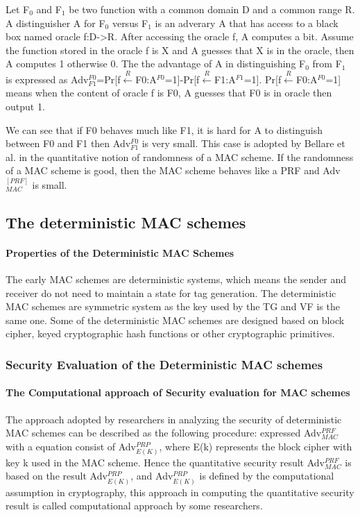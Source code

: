 \documentclass{article}
\begin{document}
Let F$_0$ and F$_1$ be two function with a common domain D and a common range R. A distinguisher A for F$_0$ versus F$_1$ is an adverary A that has access to a black box named oracle f:D->R. After accessing the oracle f, A computes a bit. Assume the function stored in the oracle f is X and A guesses that X is in the oracle, then A computes 1 otherwise 0. The the advantage of A in distinguishing F$_0$ from F$_1$ is expressed as Adv$^{F0}_{F1}$=Pr[f$\stackrel{R}{\longleftarrow}$F0:A$^{F0}$=1]-Pr[f$\stackrel{R}{\longleftarrow}$F1:A$^{F1}$=1]. Pr[f$\stackrel{R}{\longleftarrow}$F0:A$^{F0}$=1] means when the content of oracle f is F0, A guesses that F0 is in oracle then output 1.

We can see that if F0 behaves much like F1, it is hard for A to distinguish between F0 and F1 then Adv$^{F0}_{F1}$ is very small. This case is adopted by Bellare et al. in the quantitative notion of randomness of a MAC scheme. If the randomness of a MAC scheme is good, then the MAC scheme behaves like a PRF and Adv$^{[PRF]}_{MAC}$ is small. 



\subsection{The deterministic MAC schemes}
\paragraph{Properties of the Deterministic MAC Schemes}
The early MAC schemes are deterministic systems, which means the sender and receiver do not need to maintain a state for tag generation. The deterministic MAC schemes are symmetric system as the key used by the TG and VF is the same one. Some of the deterministic MAC schemes are designed based on block cipher, keyed cryptographic hash functions or other cryptographic primitives.
\subsubsection{Security Evaluation of the Deterministic MAC schemes}
\paragraph{The Computational approach of Security evaluation for MAC schemes}
The approach adopted by researchers in analyzing the security of deterministic MAC schemes can be described as the following procedure: expressed Adv$^{PRF}_{MAC}$ with a equation consist of Adv$^{PRP}_{E(K)}$, where E(k) represents the block cipher with key k used in the MAC scheme. Hence the quantitative security result Adv$^{PRF}_{MAC}$ is based on the result Adv$^{PRP}_{E(K)}$, and Adv$^{PRP}_{E(K)}$ is defined by the computational assumption in cryptography, this approach in computing the quantitative security result is called computational approach by some researchers.
\end{document}
